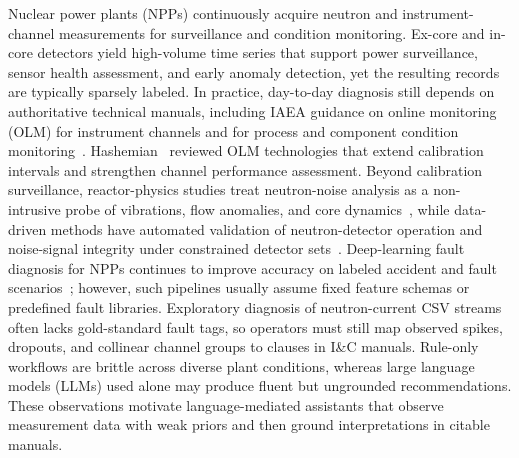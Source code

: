 
Nuclear power plants (NPPs) continuously acquire neutron and instrument-channel measurements for
surveillance and condition monitoring.
Ex-core and in-core detectors yield high-volume time series that support power surveillance, sensor
health assessment, and early anomaly detection, yet the resulting records are typically sparsely
labeled.
In practice, day-to-day diagnosis still depends on authoritative technical manuals, including IAEA
guidance on online monitoring (OLM) for instrument channels and for process and component condition
monitoring~\citep{iaea2008olm1,iaea2008olm2}.
Hashemian~\citep{hashemian2011online} reviewed OLM technologies that extend calibration intervals and
strengthen channel performance assessment.
Beyond calibration surveillance, reactor-physics studies treat neutron-noise analysis as a
non-intrusive probe of vibrations, flow anomalies, and core dynamics~\citep{pazsit2010noise,demaziere2022cortex},
while data-driven methods have automated validation of neutron-detector operation and noise-signal
integrity under constrained detector sets~\citep{tambouratzis2020neutron,tambouratzis2020decomposition}.
Deep-learning fault diagnosis for NPPs continues to improve accuracy on labeled accident and fault
scenarios~\citep{elbordany2024fault}; however, such pipelines usually assume fixed feature schemas or
predefined fault libraries.
Exploratory diagnosis of neutron-current CSV streams often lacks gold-standard fault tags, so
operators must still map observed spikes, dropouts, and collinear channel groups to clauses in I\&C
manuals.
Rule-only workflows are brittle across diverse plant conditions, whereas large language models (LLMs)
used alone may produce fluent but ungrounded recommendations.
These observations motivate language-mediated assistants that observe measurement data with weak
priors and then ground interpretations in citable manuals.

